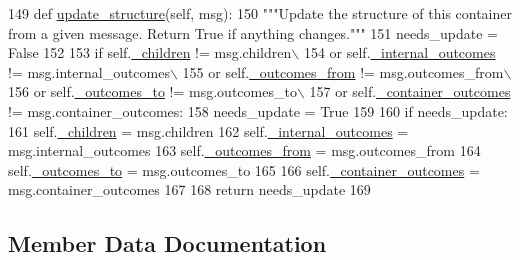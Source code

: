\begin{DoxyCode}
149     \textcolor{keyword}{def }\hyperlink{classsmacc__viewer_1_1ContainerNode_abb9e7a8f8daab12e87231622c85cebad}{update\_structure}(self, msg):
150         \textcolor{stringliteral}{"""Update the structure of this container from a given message. Return True if anything changes."""}
151         needs\_update = \textcolor{keyword}{False}
152 
153         \textcolor{keywordflow}{if} self.\hyperlink{classsmacc__viewer_1_1ContainerNode_a886cb99815f827d99bcd4c3e341284f1}{\_children} != msg.children\(\backslash\)
154                 \textcolor{keywordflow}{or} self.\hyperlink{classsmacc__viewer_1_1ContainerNode_a0cecef41d6d1036c4716d1143479743a}{\_internal\_outcomes} != msg.internal\_outcomes\(\backslash\)
155                 \textcolor{keywordflow}{or} self.\hyperlink{classsmacc__viewer_1_1ContainerNode_ad0975f45567a6339b66516548e67385a}{\_outcomes\_from} != msg.outcomes\_from\(\backslash\)
156                 \textcolor{keywordflow}{or} self.\hyperlink{classsmacc__viewer_1_1ContainerNode_a26f35e2c039a0a7d5f68a5abfc918627}{\_outcomes\_to} != msg.outcomes\_to\(\backslash\)
157                 \textcolor{keywordflow}{or} self.\hyperlink{classsmacc__viewer_1_1ContainerNode_afc173014e336c7c3ab6a5d2dd1798d63}{\_container\_outcomes} != msg.container\_outcomes:
158             needs\_update = \textcolor{keyword}{True}
159 
160         \textcolor{keywordflow}{if} needs\_update:
161             self.\hyperlink{classsmacc__viewer_1_1ContainerNode_a886cb99815f827d99bcd4c3e341284f1}{\_children} = msg.children
162             self.\hyperlink{classsmacc__viewer_1_1ContainerNode_a0cecef41d6d1036c4716d1143479743a}{\_internal\_outcomes} = msg.internal\_outcomes
163             self.\hyperlink{classsmacc__viewer_1_1ContainerNode_ad0975f45567a6339b66516548e67385a}{\_outcomes\_from} = msg.outcomes\_from
164             self.\hyperlink{classsmacc__viewer_1_1ContainerNode_a26f35e2c039a0a7d5f68a5abfc918627}{\_outcomes\_to} = msg.outcomes\_to
165 
166             self.\hyperlink{classsmacc__viewer_1_1ContainerNode_afc173014e336c7c3ab6a5d2dd1798d63}{\_container\_outcomes} = msg.container\_outcomes
167 
168         \textcolor{keywordflow}{return} needs\_update
169 
\end{DoxyCode}


\subsection{Member Data Documentation}
